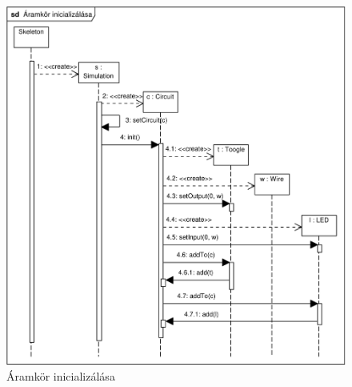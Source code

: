 \begin{figure}[H]
\begin{center}
\includegraphics[width=17cm]{chapters/chapter05/imgs/init.pdf}
\caption{Áramkör inicializálása}
\label{fig:init}
\end{center}
\end{figure}
